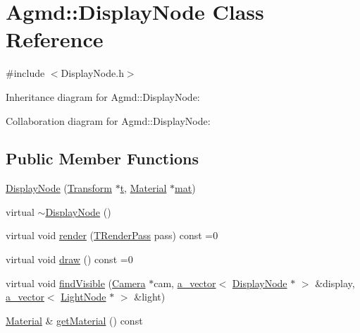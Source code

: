 \hypertarget{class_agmd_1_1_display_node}{\section{Agmd\+:\+:Display\+Node Class Reference}
\label{class_agmd_1_1_display_node}
}


{\ttfamily \#include $<$Display\+Node.\+h$>$}



Inheritance diagram for Agmd\+:\+:Display\+Node\+:


Collaboration diagram for Agmd\+:\+:Display\+Node\+:
\subsection*{Public Member Functions}
\begin{DoxyCompactItemize}
\item 
\hyperlink{class_agmd_1_1_display_node_a4f497a75b192c795061a9167710ef73f}{Display\+Node} (\hyperlink{class_agmd_maths_1_1_transform}{Transform} $\ast$\hyperlink{_examples_2_planet_2_app_8cpp_a125ce9f8ead659256dbdd0816ede24d4}{t}, \hyperlink{class_agmd_1_1_material}{Material} $\ast$\hyperlink{_examples_2_planet_2_app_8cpp_ab1c3784ff3dfc4e8cd95bfcb681f720b}{mat})
\item 
virtual \hyperlink{class_agmd_1_1_display_node_abb894413a0b84536608aa5ff7a16f15f}{$\sim$\+Display\+Node} ()
\item 
virtual void \hyperlink{class_agmd_1_1_display_node_a77a583f122dde9f7d2bfb1f10f7e47b0}{render} (\hyperlink{namespace_agmd_a893087981df53d0bf39466e9039aeb73}{T\+Render\+Pass} pass) const =0
\item 
virtual void \hyperlink{class_agmd_1_1_display_node_a13dd7059195a342e38cccc8989d317cb}{draw} () const =0
\item 
virtual void \hyperlink{class_agmd_1_1_display_node_aeecd3fa458a80f9d4f69f09bb7087f2e}{find\+Visible} (\hyperlink{class_agmd_1_1_camera}{Camera} $\ast$cam, \hyperlink{_vector_8h_a3df82cea60ff4ad0acb44e58454406a5}{a\+\_\+vector}$<$ \hyperlink{class_agmd_1_1_display_node}{Display\+Node} $\ast$ $>$ \&display, \hyperlink{_vector_8h_a3df82cea60ff4ad0acb44e58454406a5}{a\+\_\+vector}$<$ \hyperlink{class_agmd_1_1_light_node}{Light\+Node} $\ast$ $>$ \&light)
\item 
\hyperlink{class_agmd_1_1_material}{Material} \& \hyperlink{class_agmd_1_1_display_node_a28bd0df97f134c750e0a081c3a1cd962}{get\+Material} () const 
\item 

\end{DoxyCompactItemize}

